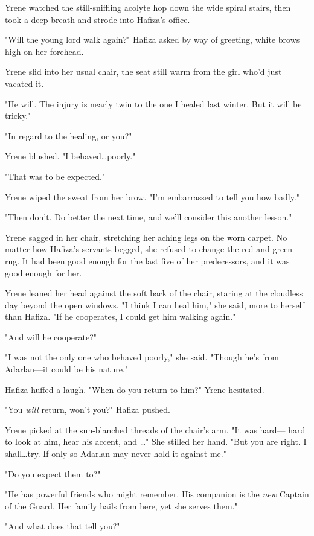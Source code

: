 Yrene watched the still-sniffling acolyte hop down the wide spiral stairs, then took a deep breath and strode into Hafiza's office.

"Will the young lord walk again?"
Hafiza asked by way of greeting, white brows high on her forehead.

Yrene slid into her usual chair, the seat still warm from the girl who'd just vacated it.

"He will.
The injury is nearly twin to the one I healed last winter.
But it will be tricky."

"In regard to the healing, or you?"

Yrene blushed.
"I behaved\ldots poorly."

"That was to be expected."

Yrene wiped the sweat from her brow.
"I'm embarrassed to tell you how badly."

"Then don't.
Do better the next time, and we'll consider this another lesson."

Yrene sagged in her chair, stretching her aching legs on the worn carpet.
No matter how Hafiza's servants begged, she refused to change the red-and-green rug.
It had been good enough for the last five of her predecessors, and it was good enough for her.

Yrene leaned her head against the soft back of the chair, staring at the cloudless day beyond the open windows.
"I think I can heal him," she said, more to herself than Hafiza.
"If he cooperates, I could get him walking again."

"And will he cooperate?"

"I was not the only one who behaved poorly," she said.
"Though he's from Adarlan---it could be his nature."

Hafiza huffed a laugh.
"When do you return to him?"
Yrene hesitated.

"You \emph{will} return, won't you?"
Hafiza pushed.

Yrene picked at the sun-blanched threads of the chair's arm.
"It was hard--- hard to look at him, hear his accent, and \ldots" She stilled her hand.
"But you are right.
I shall\ldots try.
If only so Adarlan may never hold it against me."

"Do you expect them to?"

"He has powerful friends who might remember.
His companion is the \emph{new} Captain of the Guard.
Her family hails from here, yet she serves them."

"And what does that tell you?"

